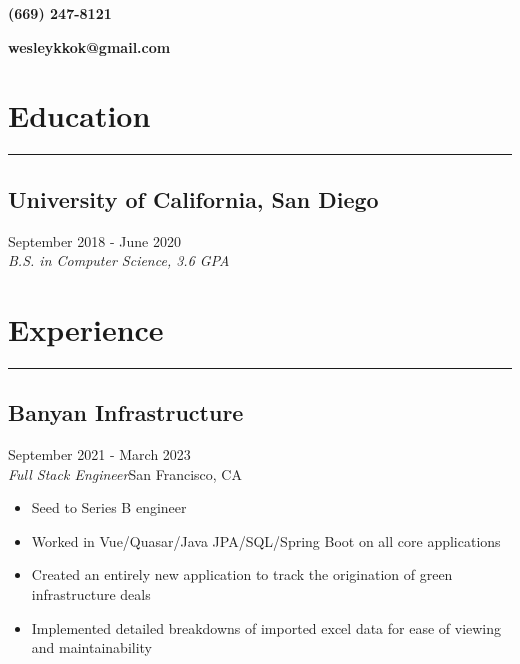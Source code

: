\documentclass{article}
\makeatletter
\renewcommand{\maketitle}
{
\vspace{-1em}
{\hfill\large\bf (669) 247-8121}

\vspace{-2em}
{\noindent\fontsize{40pt}{0pt}\selectfont\bf\color{DarkMidnightBlue} \theauthor} 

\vspace{-1.5em}
{\hfill\large\bf wesleykkok@gmail.com}

}
\makeatother
\begin{document}
\author{Wesley Kok}
\maketitle 					%
\thispagestyle{empty} 		%
\large 						%
\setlength\parindent{0pt}	%

\vspace{-0.5em}
\section{Education}
\vspace{-1.5em}
\par\noindent\rule{\textwidth}{0.4pt}

\vspace{-0.5em}
\subsection{University of California, San Diego}\hfill {\color{NavyBlue}September 2018 - June 2020\\ 
{\color{Black}\it B.S. in Computer Science, 3.6 GPA}}

\vspace{-0.5em}
\section{Experience}
\vspace{-1.5em}
\par\noindent\rule{\textwidth}{0.4pt}

\vspace{-0.5em}
\subsection{Banyan Infrastructure}\hfill {\color{NavyBlue}September 2021 - March 2023\\ {\color{Black}\it Full Stack Engineer}\hfill San Francisco, CA}%
\begin{itemize}
\itemsep0em 
	\item Seed to Series B engineer
	\item Worked in Vue/Quasar/Java JPA/SQL/Spring Boot on all core applications
	\item Created an entirely new application to track the origination of green infrastructure deals
	\item Implemented detailed breakdowns of imported excel data for ease of viewing and maintainability
\end{itemize}
\end{document}
